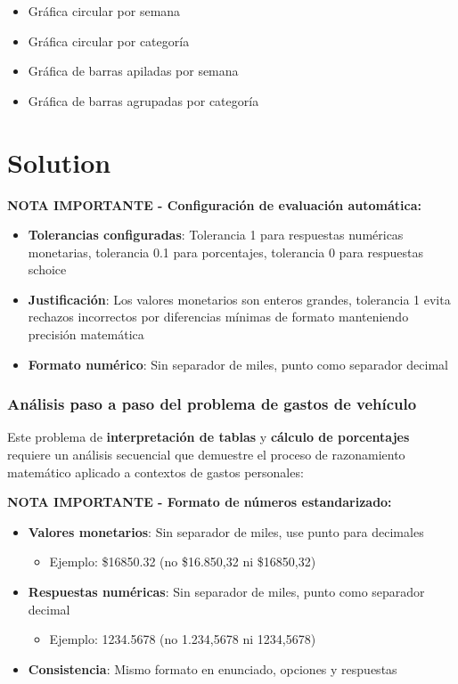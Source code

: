 \documentclass[
]{article}
\providecommand{\tightlist}{%
  \setlength{\itemsep}{0pt}\setlength{\parskip}{0pt}}
\begin{document}
\begin{itemize}
\tightlist
\item
  Gráfica circular por semana
\item
  Gráfica circular por categoría
\item
  Gráfica de barras apiladas por semana
\item
  Gráfica de barras agrupadas por categoría
\end{itemize}

\section{Solution}\label{solution}

\textbf{NOTA IMPORTANTE - Configuración de evaluación automática:}

\begin{itemize}
\tightlist
\item
  \textbf{Tolerancias configuradas}: Tolerancia 1 para respuestas
  numéricas monetarias, tolerancia 0.1 para porcentajes, tolerancia 0
  para respuestas schoice
\item
  \textbf{Justificación}: Los valores monetarios son enteros grandes,
  tolerancia 1 evita rechazos incorrectos por diferencias mínimas de
  formato manteniendo precisión matemática
\item
  \textbf{Formato numérico}: Sin separador de miles, punto como
  separador decimal
\end{itemize}

\subsubsection{Análisis paso a paso del problema de gastos de
vehículo}\label{anuxe1lisis-paso-a-paso-del-problema-de-gastos-de-vehuxedculo}

Este problema de \textbf{interpretación de tablas} y \textbf{cálculo de
porcentajes} requiere un análisis secuencial que demuestre el proceso de
razonamiento matemático aplicado a contextos de gastos personales:

\textbf{NOTA IMPORTANTE - Formato de números estandarizado:}

\begin{itemize}
\tightlist
\item
  \textbf{Valores monetarios}: Sin separador de miles, use punto para
  decimales

  \begin{itemize}
  \tightlist
  \item
    Ejemplo: \$16850.32 (no \$16.850,32 ni \$16850,32)
  \end{itemize}
\item
  \textbf{Respuestas numéricas}: Sin separador de miles, punto como
  separador decimal

  \begin{itemize}
  \tightlist
  \item
    Ejemplo: 1234.5678 (no 1.234,5678 ni 1234,5678)
  \end{itemize}
\item
  \textbf{Consistencia}: Mismo formato en enunciado, opciones y
  respuestas
\end{itemize}
\end{document}
